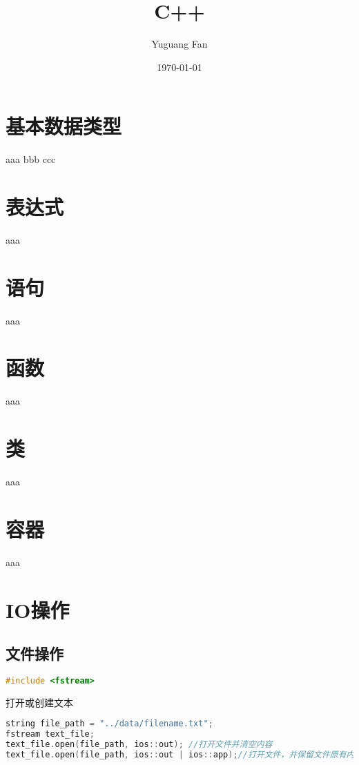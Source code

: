 \documentclass[11pt,a4paper]{article}
\title{C++}
\author{Yuguang Fan}
\date{\today}
\begin{document}
\maketitle

\section{基本数据类型}

aaa
bbb
ccc

\section{表达式}

aaa

\section{语句}

aaa

\section{函数}

aaa

\section{类}

aaa

\section{容器}

aaa

\section{IO操作}

\subsection{文件操作}

\begin{lstlisting}[language={C++}]
#include <fstream>
\end{lstlisting}

打开或创建文本

\begin{lstlisting}[language={C++}]
string file_path = "../data/filename.txt";
fstream text_file;
text_file.open(file_path, ios::out); //打开文件并清空内容
text_file.open(file_path, ios::out | ios::app);//打开文件，并保留文件原有内容，定位到文件末尾
\end{lstlisting}
\end{document}
